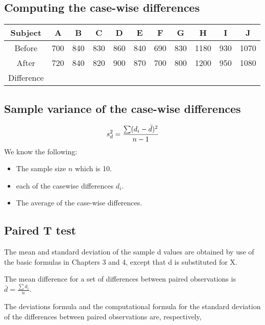 \documentclass[a4paper,12pt]{article}
\begin{document}
\medskip


\subsection*{Computing the case-wise differences}
\begin{center}
\begin{tabular}{|c|c|c|c|c|c|c|c|c|c|c|}
\hline
Subject& A& B& C& D& E &F &G &H &I &J\\  \hline
Before &700& 840& 830& 860& 840 &690 &830& 1180& 930& 1070\\  \hline
After &720 &840 &820 &900 &870 &700 &800& 1200& 950& 1080\\  \hline
Difference &  & & & & & & & & & \\
\hline
\end{tabular}
\end{center}
\medskip

\subsection*{Sample variance of the case-wise differences}
\Large
\[s_d^2 = {\sum ( d_i - \bar{d})^2\over n-1}\]
We know the following:
\begin{itemize}
\item The sample size $n$ which is 10.
\item each of the casewise differences $d_i$.
\item The average of the case-wise differences.
\end{itemize}
\medskip



\subsection{Paired T test}
The mean and standard deviation of the sample d values are
obtained by use of the basic formulas in Chapters 3 and 4, except
that d is substituted for X.

The mean difference for a set of differences between paired
observations is $\bar{d} = \frac{\sum d_{i}}{n}$.

The deviations formula and the computational formula for the
standard deviation of the differences between paired observations
are, respectively,
\end{document}
